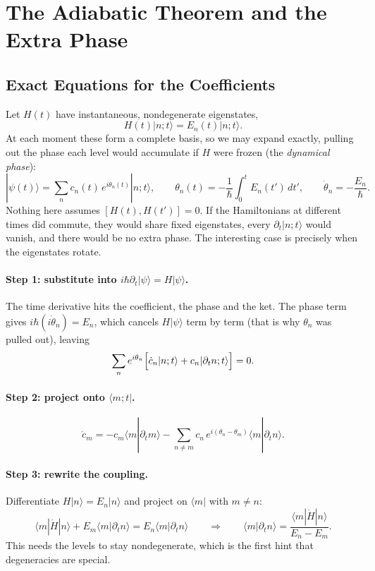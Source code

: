 \section{The Adiabatic Theorem and the Extra Phase}

\subsection{Exact Equations for the Coefficients}

Let $H(t)$ have instantaneous, nondegenerate eigenstates,
\[
    H(t)|n;t\rangle = E_n(t)|n;t\rangle .
\]
At each moment these form a complete basis, so we may expand exactly, pulling out the phase each level would accumulate if $H$ were frozen (the \emph{dynamical phase}):
\[
    |\psi(t)\rangle = \sum_n c_n(t)\,e^{i\theta_n(t)}|n;t\rangle,
    \qquad
    \theta_n(t) = -\frac1\hbar\int_0^tE_n(t')\,dt',
    \qquad
    \dot\theta_n = -\frac{E_n}{\hbar}.
\]
Nothing here assumes $[H(t),H(t')] = 0$. If the Hamiltonians at different times did commute, they would share fixed eigenstates, every $\partial_t|n;t\rangle$ would vanish, and there would be no extra phase. The interesting case is precisely when the eigenstates rotate.

\paragraph{Step 1: substitute into $i\hbar\partial_t|\psi\rangle = H|\psi\rangle$.} The time derivative hits the coefficient, the phase and the ket. The phase term gives $i\hbar(i\dot\theta_n) = E_n$, which cancels $H|\psi\rangle$ term by term (that is why $\theta_n$ was pulled out), leaving
\[
    \sum_n e^{i\theta_n}\Bigl[\dot c_n|n;t\rangle + c_n|\partial_tn;t\rangle\Bigr] = 0 .
\]

\paragraph{Step 2: project onto $\langle m;t|$.}
\[
    \dot c_m = -c_m\langle m|\partial_tm\rangle - \sum_{n\neq m}c_n\,e^{i(\theta_n-\theta_m)}\langle m|\partial_tn\rangle .
\]

\paragraph{Step 3: rewrite the coupling.} Differentiate $H|n\rangle = E_n|n\rangle$ and project on $\langle m|$ with $m\neq n$:
\begin{equation}
    \langle m|\dot H|n\rangle + E_m\langle m|\partial_tn\rangle = E_n\langle m|\partial_tn\rangle
    \qquad\Longrightarrow\qquad
    \langle m|\partial_tn\rangle = \frac{\langle m|\dot H|n\rangle}{E_n-E_m}.
    \label{eq:berry-offdiag}
\end{equation}
This needs the levels to stay nondegenerate, which is the first hint that degeneracies are special.


